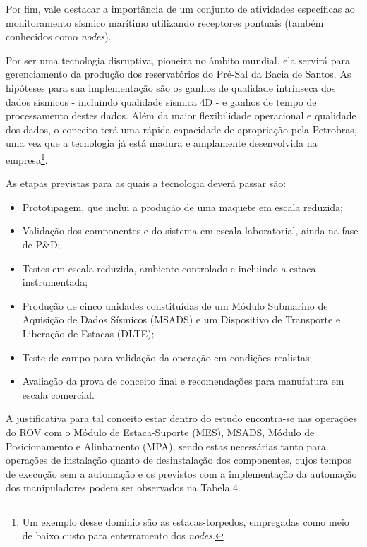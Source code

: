 Por fim, vale destacar a importância de um conjunto de atividades específicas ao monitoramento sísmico marítimo utilizando receptores pontuais (também conhecidos como \textit{nodes}). 

Por ser uma tecnologia disruptiva, pioneira no âmbito mundial, ela servirá para gerenciamento da produção dos reservatórios do Pré-Sal da Bacia de Santos. As hipóteses para sua implementação são os ganhos de qualidade intrínseca dos dados sísmicos - incluindo qualidade sísmica 4D - e ganhos de tempo de processamento destes dados. Além da maior flexibilidade operacional e qualidade dos dados, o conceito terá uma rápida capacidade de apropriação pela Petrobras, uma vez que a tecnologia já está madura e amplamente desenvolvida na empresa\footnote{Um exemplo desse domínio são as estacas-torpedos, empregadas como meio de baixo custo para enterramento dos \textit{nodes}.}.

As etapas previstas para as quais a tecnologia deverá passar são: 

\begin{itemize}
	\item Prototipagem, que inclui a produção de uma maquete em escala reduzida;
	\item Validação dos componentes e do sistema em escala laboratorial, ainda na fase de P\&D;
	\item Testes em escala reduzida, ambiente controlado e incluindo a estaca instrumentada;
	\item Produção de cinco unidades constituídas de um Módulo Submarino de Aquisição de Dados Sísmicos (MSADS) e um Dispositivo de Transporte e Liberação de Estacas (DLTE);
	\item Teste de campo para validação da operação em condições realistas;
	\item Avaliação da prova de conceito final e recomendações para manufatura em escala comercial.
\end{itemize}

A justificativa para tal conceito estar dentro do estudo encontra-se nas operações do ROV com o Módulo de Estaca-Suporte (MES), MSADS, Módulo de Posicionamento e Alinhamento (MPA), sendo estas necessárias tanto para operações de instalação quanto de desinstalação dos componentes, cujos tempos de execução sem a automação e os previstos com a implementação da automação dos manipuladores podem ser observados na Tabela 4.

